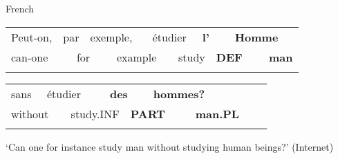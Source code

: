 \begin{listWWNumileveli}
\item {}

\begin{styleExample}
French

\end{styleExample}

\end{listWWNumileveli}

\begin{tabular}{llllllllllll}
\lsptoprule
Peut-on, & \multicolumn{2}{l}{par

} & \multicolumn{2}{l}{exemple,

} & \multicolumn{2}{l}{étudier

} & \multicolumn{2}{l}{{\bfseries l’}

} & \multicolumn{2}{l}{{\bfseries  Homme}

} & \\
\multicolumn{2}{l}{can-one

} & \multicolumn{2}{l}{for

} & \multicolumn{2}{l}{example

} & \multicolumn{2}{l}{study

} & \multicolumn{2}{l}{{\bfseries DEF }

} & \multicolumn{2}{l}{{\bfseries man}

}\\
\lspbottomrule
\end{tabular}

\begin{tabular}{llllllllll}
\lsptoprule
sans & \multicolumn{2}{l}{étudier

} & \multicolumn{2}{l}{{\bfseries des}

} & \multicolumn{2}{l}{{\bfseries hommes?}

} & \multicolumn{2}{l}{} & \\
\multicolumn{2}{l}{without

} & \multicolumn{2}{l}{study.INF

} & \multicolumn{2}{l}{{\bfseries PART}

} & \multicolumn{2}{l}{{\bfseries man.PL}

} & \multicolumn{2}{l}{}\\
\lspbottomrule
\end{tabular}

\begin{styleTranslation}
‘Can one for instance study man without studying human beings?’ (Internet)

\end{styleTranslation}

